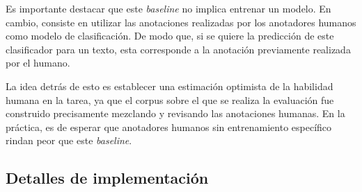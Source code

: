 Es importante destacar que este \emph{baseline} no implica entrenar un modelo. En cambio,
consiste en utilizar las anotaciones realizadas por los anotadores humanos como modelo de 
clasificaci\'on. De modo que, si se quiere la predicci\'on de este clasificador para un texto, 
esta corresponde a la anotaci\'on previamente realizada por el humano.

La idea detr\'as de esto es establecer una estimaci\'on optimista de la habilidad humana en
la tarea, ya que el corpus sobre el que se realiza la evaluaci\'on fue construido precisamente 
mezclando y revisando las anotaciones humanas. En la pr\'actica, es de esperar que 
anotadores humanos sin entrenamiento espec\'ifico rindan peor que este \emph{baseline}.


\subsection{Detalles de implementaci\'on}

